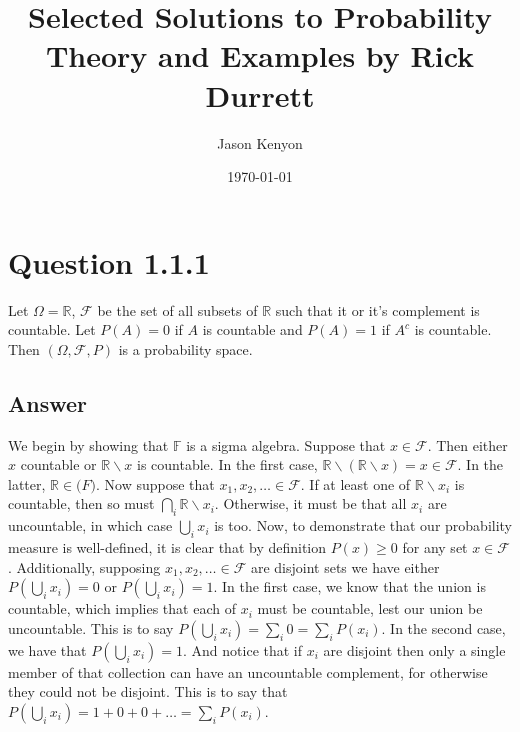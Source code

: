 \documentclass[
	12pt, %
]{fphw}
\title{Selected Solutions to Probability Theory and Examples by Rick Durrett} %
\author{Jason Kenyon} %
\date{\today} %
\institute{Binghamton University \\ Department of Mathematics} %
\begin{document}
\maketitle %


\section*{Question 1.1.1}

\begin{problem}
	Let $\Omega=\mathbb{R}$, $\mathcal{F}$ be the set of all subsets of $\mathbb{R}$ such that it or it's complement is countable. Let $P(A)=0$ if $A$ is countable and $P(A)=1$ if $A^{c}$ is countable. Then $(\Omega, \mathcal{F}, P)$ is a probability space.
\end{problem}


\subsection*{Answer}
We begin by showing that $\mathbb{F}$ is a sigma algebra. Suppose that $x \in \mathcal{F}$. Then either $x$ countable or $\mathbb{R} \backslash x$ is countable. In the first case,
$\mathbb{R} \backslash(\mathbb{R} \backslash x)=x \in \mathcal{F}$. 
In the latter, $\mathbb{R} \in \mathcal(F)$. Now suppose that
$x_1, x_2, \dots \in \mathcal{F}$. If at least one of $\mathbb{R} \backslash x_i$ is countable, then
so must $\bigcap_i\mathbb{R} \backslash x_i$. Otherwise, it must be that all $x_i$ are uncountable, in which case $\bigcup_i x_i$ is too. Now, to demonstrate that our probability measure is well-defined, it is clear that by definition $P(x)\geq 0$ for any set $x \in \mathcal{F}$. Additionally, supposing $x_1, x_2, \dots \in \mathcal{F}$ are disjoint sets
we have either $P(\bigcup_ix_i)=0$ or $P(\bigcup_ix_i)=1$. In the first case, we know that the union is countable, which implies that each of $x_i$ must be countable, lest our union be uncountable. This is to say $P(\bigcup_ix_i)=\sum_i0=\sum_iP(x_i)$. In the second case, we have that $P(\bigcup_ix_i)=1$. And notice that if $x_i$ are disjoint then only a single member of that collection can have an uncountable complement, for otherwise they could not be disjoint. This is to say that $P(\bigcup_ix_i)=1+0+0+ \dots=\sum_iP(x_i)$.



\end{document}
